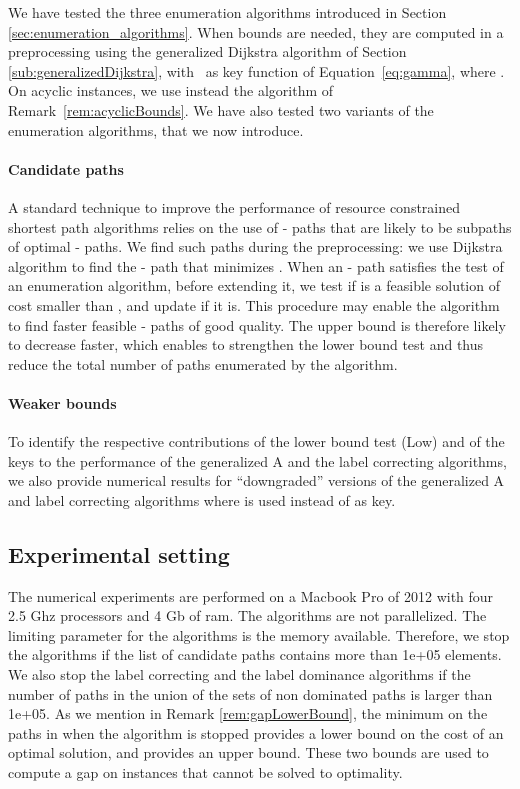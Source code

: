 \documentclass[11pt]{amsart}
\theoremstyle{plain}
\theoremstyle{remark}
\begin{document}
We have tested the three enumeration algorithms introduced in Section \ref{sec:enumeration_algorithms}. When bounds  are needed, they are computed in a preprocessing using the generalized Dijkstra algorithm of Section \ref{sub:generalizedDijkstra}, with~ as key function  of Equation~\eqref{eq:gamma}, where . On acyclic instances, we use instead the algorithm of Remark~\ref{rem:acyclicBounds}.  We have also tested two variants of the enumeration algorithms, that we now introduce. 

 \paragraph{Candidate paths}
 A standard technique to improve the performance of resource constrained shortest path algorithms \citep{dumitrescu2003improved} relies on the use of - paths  that are likely to be subpaths of optimal - paths. We find such paths  during the preprocessing: we use Dijkstra algorithm to find the - path  that minimizes . When an - path  satisfies the test of an enumeration algorithm, before extending it, we test if  is a feasible solution of cost smaller than , and update  if it is. This procedure may enable the algorithm to find faster feasible - paths of good quality. The upper bound  is therefore likely to decrease faster, which enables to strengthen the lower bound test and thus reduce the total number of paths enumerated by the algorithm. 

\paragraph{Weaker bounds} To identify the respective contributions of the lower bound test (Low) and of the keys  to the performance of the generalized A and the label correcting algorithms, we also provide numerical results for ``downgraded'' versions of the generalized A and label correcting algorithms where  is used instead of  as key. 


\subsection{Experimental setting} \label{sub:experimental_setting}

The numerical experiments are performed on a Macbook Pro of 2012 with four 2.5 Ghz processors and 4 Gb of ram. The algorithms are not parallelized. The limiting parameter for the algorithms is the memory available. Therefore, we stop the algorithms if the list  of candidate paths contains more than 1e+05 elements. We also stop the label correcting and the label dominance algorithms if the number of paths in the union of the sets of non dominated paths  is larger than 1e+05. As we mention in Remark \ref{rem:gapLowerBound}, the minimum  on the paths  in  when the algorithm is stopped provides a lower bound on the cost of an optimal solution, and  provides an upper bound. These two bounds are used to compute a gap on instances that cannot be solved to optimality. 
\end{document}
